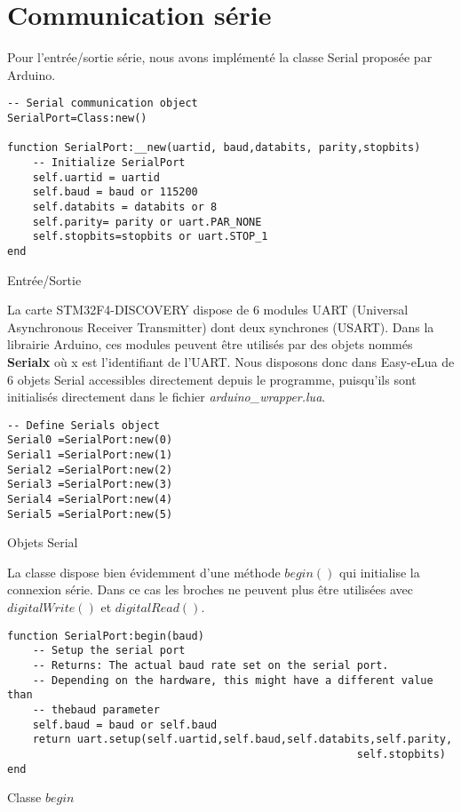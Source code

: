 \section{Communication série}

Pour l'entrée/sortie série, nous avons implémenté la classe Serial proposée par Arduino.

\begin{table}[h]
\begin{lstlisting}
-- Serial communication object
SerialPort=Class:new()

function SerialPort:__new(uartid, baud,databits, parity,stopbits)
    -- Initialize SerialPort
    self.uartid = uartid
    self.baud = baud or 115200
    self.databits = databits or 8
    self.parity= parity or uart.PAR_NONE
    self.stopbits=stopbits or uart.STOP_1
end
\end{lstlisting}
\caption{Entrée/Sortie}
\end{table}

La carte STM32F4-DISCOVERY dispose de 6 modules UART (Universal Asynchronous Receiver Transmitter) dont deux synchrones (USART).
 Dans la librairie Arduino, ces modules peuvent être utilisés par des objets nommés \textbf{Serialx} où x est l’identifiant de l’UART. 
Nous disposons donc dans Easy-eLua de 6 objets Serial accessibles directement depuis le programme, puisqu’ils sont initialisés 
directement dans le fichier \textit{arduino\_wrapper.lua}.

\begin{table}[h]
\begin{lstlisting}
-- Define Serials object
Serial0 =SerialPort:new(0)
Serial1 =SerialPort:new(1)
Serial2 =SerialPort:new(2)
Serial3 =SerialPort:new(3)
Serial4 =SerialPort:new(4)
Serial5 =SerialPort:new(5)
\end{lstlisting}
\caption{Objets Serial}
\end{table}

\newpage
La classe dispose bien évidemment d’une méthode $begin()$
qui initialise la connexion série. Dans ce cas les broches ne peuvent plus être utilisées avec $digitalWrite()$ et $digitalRead()$.

\begin{table}[h]
\begin{lstlisting}
function SerialPort:begin(baud)
    -- Setup the serial port
    -- Returns: The actual baud rate set on the serial port.
    -- Depending on the hardware, this might have a different value than
    -- thebaud parameter
    self.baud = baud or self.baud
    return uart.setup(self.uartid,self.baud,self.databits,self.parity,
                                                       self.stopbits)
end
\end{lstlisting}
\caption{Classe $begin$}
\end{table}

